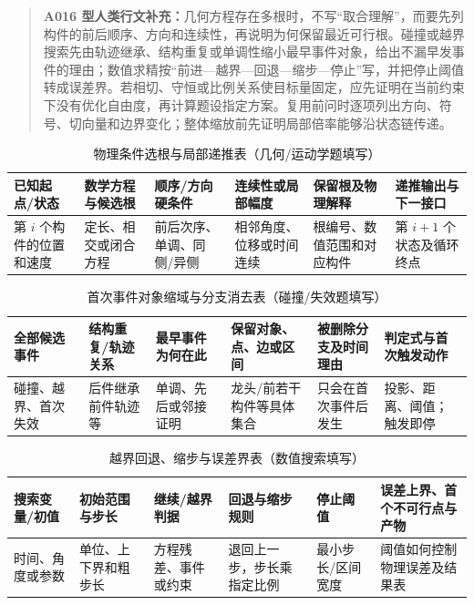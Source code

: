\documentclass[withoutpreface,bwprint]{cumcmthesis}
\begin{document}
  \begin{quote}\small
  \textbf{A016 型人类行文补充：}几何方程存在多根时，不写“取合理解”，而要先列构件的前后顺序、方向和连续性，再说明为何保留最近可行根。碰撞或越界搜索先由轨迹继承、结构重复或单调性缩小最早事件对象，给出不漏早发事件的理由；数值求精按“前进—越界—回退—缩步—停止”写，并把停止阈值转成误差界。若相切、守恒或比例关系使目标量固定，应先证明在当前约束下没有优化自由度，再计算题设指定方案。复用前问时逐项列出方向、符号、切向量和边界变化；整体缩放前先证明局部倍率能够沿状态链传递。
  \end{quote}
  \begin{table}[H]
    \centering
    \small
    \setlength{\tabcolsep}{3.2pt}
    \caption{物理条件选根与局部递推表（几何/运动学题填写）}
    \label{tab:physical-root-selection-guide}
    \begin{tabular}{p{1.9cm}p{2.1cm}p{2.15cm}p{2.2cm}p{2.3cm}p{2.3cm}}
      \toprule
      已知起点/状态 & 数学方程与候选根 & 顺序/方向硬条件 & 连续性或局部幅度 & 保留根及物理解释 & 递推输出与下一接口 \\
      \midrule
      第 $i$ 个构件的位置和速度 & 定长、相交或闭合方程 & 前后次序、单调、同侧/异侧 & 相邻角度、位移或时间连续 & 根编号、数值范围和对应构件 & 第 $i+1$ 个状态及循环终点 \\
      \bottomrule
    \end{tabular}
  \end{table}
  \begin{table}[H]
    \centering
    \small
    \setlength{\tabcolsep}{3.2pt}
    \caption{首次事件对象缩域与分支消去表（碰撞/失效题填写）}
    \label{tab:first-event-reduction-guide}
    \begin{tabular}{p{2.0cm}p{2.15cm}p{2.2cm}p{2.35cm}p{2.25cm}p{2.1cm}}
      \toprule
      全部候选事件 & 结构重复/轨迹关系 & 最早事件为何在此 & 保留对象、点、边或区间 & 被删除分支及时间理由 & 判定式与首次触发动作 \\
      \midrule
      碰撞、越界、首次失效 & 后件继承前件轨迹等 & 单调、先后或邻接证明 & 龙头/前若干构件等具体集合 & 只会在首次事件后发生 & 投影、距离、阈值；触发即停 \\
      \bottomrule
    \end{tabular}
  \end{table}
  \begin{table}[H]
    \centering
    \small
    \setlength{\tabcolsep}{3.2pt}
    \caption{越界回退、缩步与误差界表（数值搜索填写）}
    \label{tab:rollback-error-bound-guide}
    \begin{tabular}{p{1.85cm}p{2.1cm}p{2.2cm}p{2.2cm}p{2.15cm}p{2.45cm}}
      \toprule
      搜索变量/初值 & 初始范围与步长 & 继续/越界判据 & 回退与缩步规则 & 停止阈值 & 误差上界、首个不可行点与产物 \\
      \midrule
      时间、角度或参数 & 单位、上下界和粗步长 & 方程残差、事件或约束 & 退回上一步，步长乘指定比例 & 最小步长/区间宽度 & 阈值如何控制物理误差及结果表 \\
      \bottomrule
    \end{tabular}
  \end{table}
\end{document}
